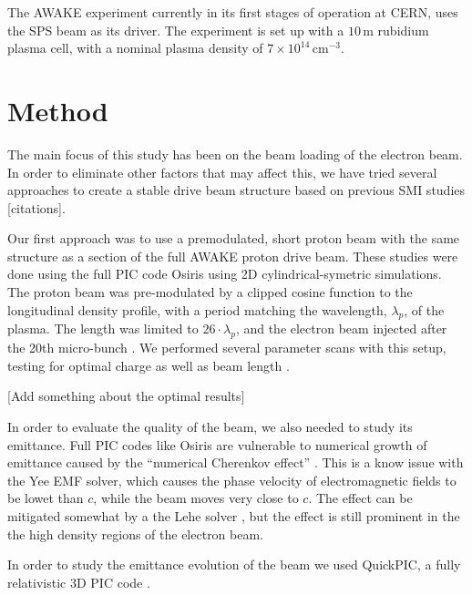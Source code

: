 \documentclass[aps,prstab,reprint,amsmath,amssymb,groupedaddress]{revtex4-1}
\newcommand{\unit}[1]{\,\mathrm{#1}}
\newcommand{\nexp}[1]{\times 10^{#1}}
\begin{document}
The AWAKE experiment currently in its first stages of operation at CERN, uses the SPS beam as its driver. The experiment
is set up with a $10\unit{m}$ rubidium plasma cell, with a nominal plasma density of $7\nexp{14}\unit{cm}^{-3}$.

\section[\label{S:M}]{Method}

The main focus of this study has been on the beam loading of the electron beam. In order to eliminate other factors that
may affect this, we have tried several approaches to create a stable drive beam structure based on previous SMI studies
[citations].

Our first approach was to use a premodulated, short proton beam with the same structure as a section of the full AWAKE
proton drive beam. These studies were done using the full PIC code Osiris \cite{fonseca:2002} using 2D
cylindrical-symetric simulations. The proton beam was pre-modulated by a clipped cosine function to the longitudinal
density profile, with a period matching the wavelength, $\lambda_p$, of the plasma. The length was limited to
$26\cdot\lambda_p$, and the electron beam injected after the 20th micro-bunch \cite{berglyd_olsen:2015}. We performed
several parameter scans with this setup, testing for optimal charge as well as beam length
\cite{adli:2016, berglyd_olsen:2016}.

[Add something about the optimal results]

In order to evaluate the quality of the beam, we also needed to study its emittance. Full PIC codes like Osiris are
vulnerable to numerical growth of emittance caused by the ``numerical Cherenkov effect'' \cite{godfrey:1974}. This is a
know issue with the Yee EMF solver, which causes the phase velocity of electromagnetic fields to be lowet than $c$,
while the beam moves very close to $c$. The effect can be mitigated somewhat by a the Lehe solver \cite{lehe:2013}, but
the effect is still prominent in the the high density regions of the electron beam.

In order to study the emittance evolution of the beam we used QuickPIC, a fully relativistic 3D PIC code
\cite{huang:2006, an:2013}.
\end{document}
